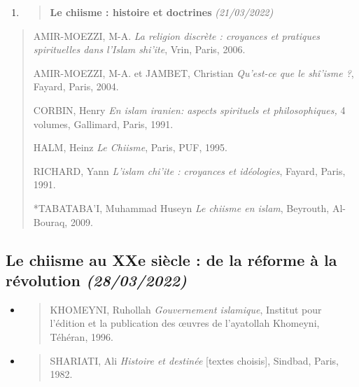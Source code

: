 \begin{enumerate}
\def\labelenumi{\arabic{enumi}.}
\setcounter{enumi}{1}
\item
  \begin{quote}
  \textbf{{Le chiisme : histoire et doctrines}}
  \emph{(21/03/2022)}
  \end{quote}
\end{enumerate}

\begin{quote}
AMIR-MOEZZI, M-A. \emph{La religion discrète : croyances et pratiques
spirituelles dans l'Islam shi'ite}, Vrin, Paris, 2006.

AMIR-MOEZZI, M-A. et JAMBET, Christian \emph{Qu'est-ce que le shî'isme
?}, Fayard, Paris, 2004.

CORBIN, Henry \emph{En islam iranien: aspects spirituels et
philosophiques,} 4 volumes, Gallimard, Paris, 1991.

HALM, Heinz \emph{Le Chiisme}, Paris, PUF, 1995.

RICHARD, Yann \emph{L'islam chi'ite : croyances et idéologies}, Fayard,
Paris, 1991.

*TABATABA'I, Muhammad Huseyn \emph{Le chiisme en islam}, Beyrouth,
Al-Bouraq, 2009.
\end{quote}

\hypertarget{le-chiisme-au-xxe-siuxe8cle-de-la-ruxe9forme-uxe0-la-ruxe9volution-28032022}{%
\subsection{\texorpdfstring{{Le chiisme au XXe siècle : de la
réforme à la révolution}
\emph{(28/03/2022)}}{Le chiisme au XXe siècle : de la réforme à la révolution (28/03/2022)}}\label{le-chiisme-au-xxe-siuxe8cle-de-la-ruxe9forme-uxe0-la-ruxe9volution-28032022}}

\begin{itemize}
\item
  \begin{quote}
  KHOMEYNI, Ruhollah \emph{Gouvernement islamique}, Institut pour
  l'édition et la publication des œuvres de l'ayatollah Khomeyni,
  Téhéran, 1996.
  \end{quote}
\item
  \begin{quote}
  SHARIATI, Ali \emph{Histoire et destinée} {[}textes choisis{]},
  Sindbad, Paris, 1982.
  \end{quote}
\end{itemize}

